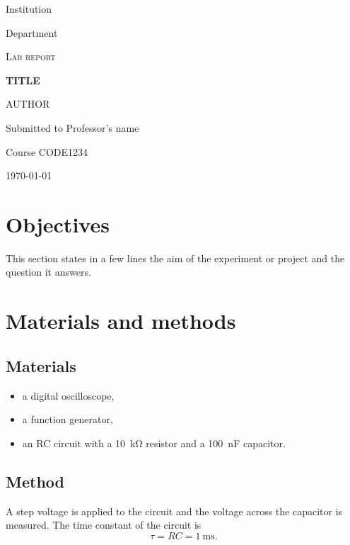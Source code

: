 \documentclass[11pt]{article}
\begin{document}
\begin{titlepage}
  \centering
  {\large Institution \par}
  {\large Department \par}
  \vspace{4cm}
  {\scshape Lab report \par}
  \vspace{1cm}
  {\huge\bfseries {{TITLE}} \par}
  \vspace{2cm}
  {\Large {{AUTHOR}} \par}
  \vspace{1cm}
  Submitted to Professor's name \par
  Course CODE1234 \par
  \vfill
  {\large \today \par}
\end{titlepage}

\tableofcontents
\newpage

\section{Objectives}

This section states in a few lines the aim of the experiment or project and
the question it answers.

\section{Materials and methods}

\subsection{Materials}

\begin{itemize}
  \item a digital oscilloscope,
  \item a function generator,
  \item an RC circuit with a \qty{10}{\kilo\ohm} resistor and a
        \qty{100}{\nano\farad} capacitor.
\end{itemize}

\subsection{Method}

A step voltage is applied to the circuit and the voltage across the
capacitor is measured. The time constant of the circuit is
\begin{equation}
  \tau = RC = \qty{1}{\milli\second}.
  \label{eq:tau}
\end{equation}
\end{document}
